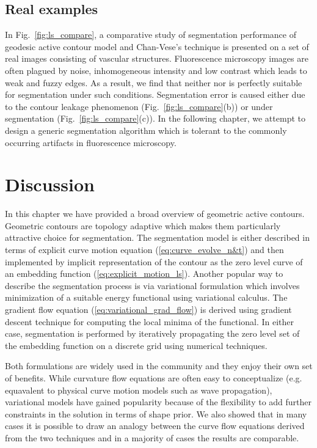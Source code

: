 \subsection{Real examples}
In Fig.~\ref{fig:ls_compare}, a comparative study of segmentation performance of geodesic active contour model and Chan-Vese's technique is presented on a set of real images consisting of vascular structures. Fluorescence microscopy images are often plagued by noise, inhomogeneous intensity and low contrast which leads to weak and fuzzy edges. As a result, we find that neither \cite{caselles_geodesic} nor \cite{chan_vese} is perfectly suitable for segmentation under such conditions. Segmentation error is caused either due to the contour leakage phenomenon (Fig.~\ref{fig:ls_compare}(b)) or under segmentation (Fig.~\ref{fig:ls_compare}(c)). In the following chapter, we attempt to design a generic segmentation algorithm which is tolerant to the commonly occurring artifacts in fluorescence microscopy.
\section{Discussion} 
In this chapter we have provided a broad overview of geometric active contours. Geometric contours are topology adaptive which makes them particularly attractive choice for segmentation. The segmentation model is either described in terms of explicit curve motion equation (\ref{eq:curve_evolve_n&t}) and then implemented by implicit representation of the contour as the zero level curve of an embedding function (\ref{eq:explicit_motion_ls}). Another popular way to describe the segmentation process is via variational formulation which involves minimization of a suitable energy functional using variational calculus. The gradient flow equation (\ref{eq:variational_grad_flow}) is derived using gradient descent technique for computing the local minima of the functional. In either case, segmentation is performed by iteratively propagating the zero level set of the embedding function on a discrete grid using numerical techniques.

Both formulations are widely used in the community and they enjoy their own set of benefits. While curvature flow equations are often easy to conceptualize (e.g. equavalent to physical curve motion models such as wave propagation), variational models have gained popularity because of the flexibility to add further constraints in the solution in terms of shape prior. We also showed that in many cases it is possible to draw an analogy between the curve flow equations derived from the two techniques and in a majority of cases the results are  comparable.

